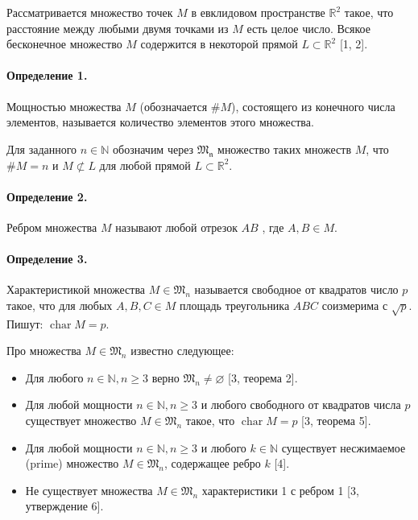 




\vzmscaption

Рассматривается множество точек $M$ в евклидовом пространстве $\mathbb{R}^{2}$ такое, что расстояние между любыми двумя точками из $M$ есть целое число. Всякое бесконечное множество $M$ содержится в некоторой прямой $L \subset \mathbb{R}^2$ [1, 2].

\paragraph{Определение 1.}
Мощностью множества $M$ (обозначается $\#M$), состоящего из конечного
числа элементов, называется количество элементов этого множества.

Для заданного $n \in \mathbb{N}$ обозначим через $\mathfrak{M_n}$ множество таких множеств $M$, что  $\#M=n$ и $M \not \subset L$ для любой прямой $L \subset \mathbb{R}^{2}$.

\paragraph{Определение 2.}
Ребром множества $M$ называют любой отрезок $AB$ , где $A, B \in M$.

\paragraph{Определение 3.}
Характеристикой множества $M \in \mathfrak{M}_{n}$ называется свободное от квадратов число $p$ такое,
что для любых $A, B, C \in M$ площадь треугольника $ABC$ соизмерима с $\sqrt{p}$.
Пишут: $\operatorname{char}{M}={p}$.


Про множества $M \in \mathfrak{M}_{n}$ известно следующее:
\begin{itemize}
	\item
		Для любого $n \in \mathbb{N}, n \geq 3$ верно $\mathfrak{M}_{n} \neq \varnothing$ [3, теорема 2].

	\item
		Для любой мощности $n \in \mathbb{N}, n \geq 3$ и любого свободного от квадратов числа $p$ существует множество $M \in \mathfrak{M}_{n}$ такое, что $\operatorname{char}{M}={p}$ [3, теорема 5].
	\item
		Для любой мощности $n \in \mathbb{N}, n \geq 3$ и любого $k \in \mathbb{N}$ существует несжимаемое (prime) множество $M \in \mathfrak{M}_{n}$, содержащее ребро ${k}$ [4].
	\item
		Не существует множества $M \in \mathfrak{M}_{n}$ характеристики 1 с ребром 1 [3, утверждение 6].
\end{itemize}

